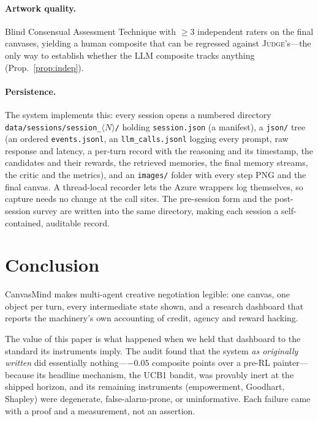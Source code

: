 \documentclass[11pt]{article}
\newcommand{\file}[1]{\textcolor{accent}{\texttt{\small #1}}}
\newcommand{\JUDGE}{\textsc{Judge}}
\theoremstyle{plain}
\theoremstyle{definition}
\begin{document}
\paragraph{Artwork quality.}
Blind Consensual Assessment Technique \citep{amabile1982social} with $\ge 3$
independent raters on the final canvases, yielding a human composite that can be
regressed against \JUDGE{}'s---the only way to establish whether the LLM
composite tracks anything (Prop.~\ref{prop:indep}).

\paragraph{Persistence.}
The system implements this: every session opens a numbered directory
\file{data/sessions/session\_$\langle N\rangle$/} holding \file{session.json} (a
manifest), a \file{json/} tree (an ordered \file{events.jsonl}, an
\file{llm\_calls.jsonl} logging every prompt, raw response and latency, a
per-turn record with the reasoning and its timestamp, the candidates and their
rewards, the retrieved memories, the final memory streams, the critic and the
metrics), and an \file{images/} folder with every step PNG and the final canvas.
A thread-local recorder lets the Azure wrappers log themselves, so capture needs
no change at the call sites. The pre-session form and the post-session survey are
written into the same directory, making each session a self-contained, auditable
record.

\section{Conclusion}
CanvasMind makes multi-agent creative negotiation legible: one canvas, one object
per turn, every intermediate state shown, and a research dashboard that reports
the machinery's own accounting of credit, agency and reward hacking.

The value of this paper is what happened when we held that dashboard to the
standard its instruments imply. The audit found that the system \emph{as
originally written} did essentially nothing---$-0.05$ composite points over a
pre-RL painter---because its headline mechanism, the UCB1 bandit, was provably
inert at the shipped horizon, and its remaining instruments (empowerment,
Goodhart, Shapley) were degenerate, false-alarm-prone, or uninformative. Each
failure came with a proof and a measurement, not an assertion.
\end{document}
